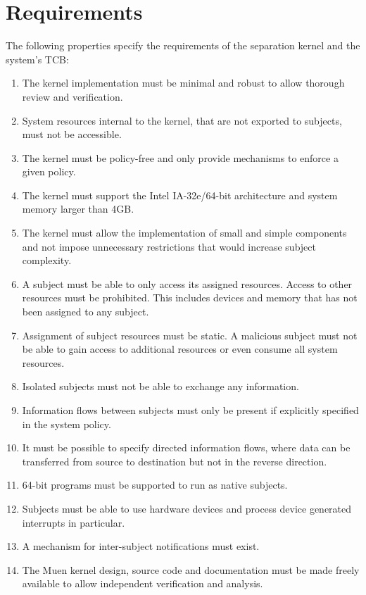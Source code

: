 \section{Requirements}\label{sec:requirements}

The following properties specify the requirements of the separation kernel and
the system's TCB:
\begin{enumerate}
	\item The kernel implementation must be minimal and robust to allow thorough
		review and verification.
	\item System resources internal to the kernel, that are not exported to
		subjects, must not be accessible.
	\item The kernel must be policy-free and only provide mechanisms to enforce
		a given policy.
	\item The kernel must support the Intel IA-32e/64-bit architecture and
		system memory larger than 4GB.
	\item The kernel must allow the implementation of small and simple
		components and not impose unnecessary restrictions that would increase
		subject complexity.
	\item A subject must be able to only access its assigned resources. Access
		to other resources must be prohibited. This includes devices and memory
		that has not been assigned to any subject.
	\item Assignment of subject resources must be static. A malicious subject
		must not be able to gain access to additional resources or even consume
		all system resources.
	\item Isolated subjects must not be able to exchange any information.
	\item Information flows between subjects must only be present if explicitly
		specified in the system policy.
	\item It must be possible to specify directed information flows, where data
		can be transferred from source to destination but not in the reverse
		direction.
	\item 64-bit programs must be supported to run as native subjects.
	\item Subjects must be able to use hardware devices and process device
		generated interrupts in particular.
	\item A mechanism for inter-subject notifications must exist.
	\item The Muen kernel design, source code and documentation must be made
		freely available to allow independent verification and analysis.
\end{enumerate}
